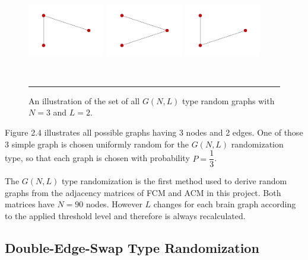 \begin{figure}[htbp]
  \centering
	\includegraphics[width=0.30\textwidth, height=40mm]{Figures/f1.png}  
	\includegraphics[width=0.30\textwidth, height=40mm]{Figures/f2.png} 
    \includegraphics[width=0.30\textwidth, height=40mm]{Figures/f3.png}

    \rule{35em}{0.5pt}
  \caption[Erdos-Renyi Example]{An illustration of the set of all $G(N,L)$ type random graphs with $N=3$ and $L=2$.}
  \label{fig:Erdos-Renyi Example}
\end{figure}

Figure 2.4 illustrates all possible graphs having 3 nodes and 2 edges. One of those 3 simple graph is chosen uniformly random for the $G(N,L)$ randomization type, so that each graph is chosen with probability $P=\dfrac{1}{3}$.  

The $G(N,L)$ type randomization is the first method used to derive random graphs from the adjacency matrices of FCM and ACM in this project. Both matrices have $N=90$ nodes. However $L$ changes for each brain graph according to the applied threshold level and therefore is always recalculated. 

\subsection{Double-Edge-Swap Type Randomization}

